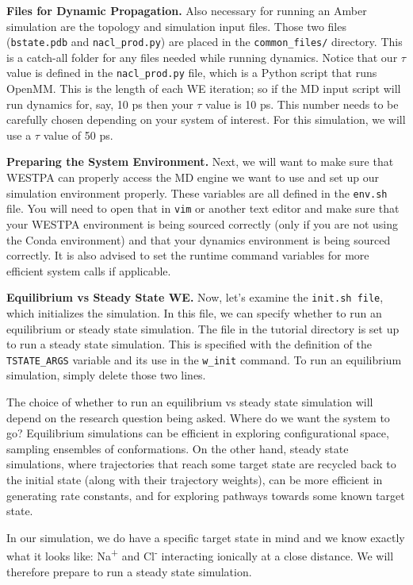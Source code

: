 \documentclass[9pt,tutorial,ASAPversion]{livecoms}
\begin{document}
\textbf{Files for Dynamic Propagation.} Also necessary for running an Amber simulation are the topology and simulation input files. 
Those two files (\verb|bstate.pdb| and \verb|nacl_prod.py|) are placed in the \verb|common_files/| directory. 
This is a catch-all folder for any files needed while running dynamics. 
Notice that our $\tau$ value is defined in the \verb|nacl_prod.py| file, which is a Python script that runs OpenMM.  
This is the length of each WE iteration; so if the MD input script will run dynamics for, say, 10 ps then your $\tau$ value is 10 ps. 
This number needs to be carefully chosen depending on your system of interest. 
For this simulation, we will use a $\tau$ value of 50 ps. 

\textbf{Preparing the System Environment.} Next, we will want to make sure that WESTPA can properly access the MD engine we want to use and set up our simulation environment properly. 
These variables are all defined in the \verb|env.sh| file. 
You will need to open that in \verb|vim| or another text editor and make sure that your WESTPA environment is being sourced correctly (only if you are not using the Conda environment) and that your dynamics environment is being sourced correctly. 
It is also advised to set the runtime command variables for more efficient system calls if applicable.

\textbf{Equilibrium vs Steady State WE.} Now, let’s examine the \verb|init.sh file|, which initializes the simulation. 
In this file, we can specify whether to run an equilibrium or steady state simulation. 
The file in the tutorial directory is set up to run a steady state simulation. 
This is specified with the definition of the \verb|TSTATE_ARGS| variable and its use in the \verb|w_init| command. 
To run an equilibrium simulation, simply delete those two lines.

The choice of whether to run an equilibrium vs steady state simulation will depend on the research question being asked. 
Where do we want the system to go?  
Equilibrium simulations can be efficient in exploring configurational space, sampling ensembles of conformations. 
On the other hand, steady state simulations, where trajectories that reach some target state are recycled back to the initial state (along with their trajectory weights), can be more efficient in generating rate constants, and for exploring pathways towards some known target state. 

In our simulation, we do have a specific target state in mind and we know exactly what it looks like: Na\textsuperscript{+} and Cl\textsuperscript{-} interacting ionically at a close distance. 
We will therefore prepare to run a steady state simulation. 
\end{document}
